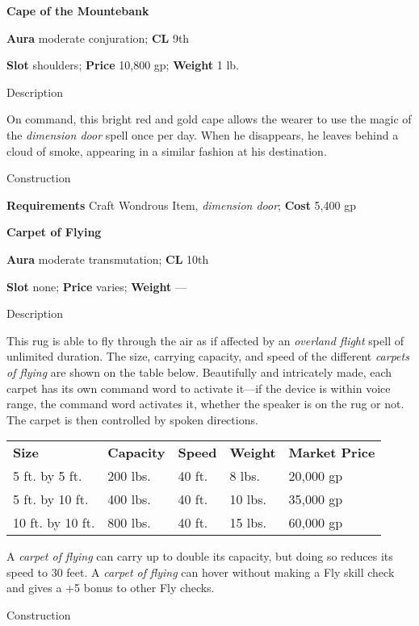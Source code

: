 \textbf{Cape of the Mountebank}
				
\textbf{Aura} moderate conjuration;\textbf{ CL }9th
				
\textbf{Slot} shoulders; \textbf{Price} 10,800 gp; \textbf{Weight} 1 lb.
				
Description
				
On command, this bright red and gold cape allows the wearer to use the magic of the \textit{dimension door }spell once per day. When he disappears, he leaves behind a cloud of smoke, appearing in a similar fashion at his destination. 
				
Construction
				
\textbf{Requirements} Craft Wondrous Item, \textit{dimension door}; \textbf{Cost }5,400 gp
				
\textbf{Carpet of Flying}
				
\textbf{Aura} moderate transmutation;\textbf{ CL }10th
				
\textbf{Slot} none; \textbf{Price} varies; \textbf{Weight }---
				
Description
				
This rug is able to fly through the air as if affected by an \textit{overland flight }spell of unlimited duration. The size, carrying capacity, and speed of the different \textit{carpets of flying }are shown on the table below. Beautifully and intricately made, each carpet has its own command word to activate it---if the device is within voice range, the command word activates it, whether the speaker is on the rug or not. The carpet is then controlled by spoken directions.
				
\begin{tabular}{lllll}
\textbf{Size} & \textbf{Capacity} & \textbf{Speed} & \textbf{Weight} & \textbf{Market Price}\\
5 ft. by 5 ft. & 200 lbs. & 40 ft. & 8 lbs. & 20,000 gp\\
5 ft. by 10 ft. & 400 lbs. & 40 ft. & 10 lbs. & 35,000 gp\\
10 ft. by 10 ft. & 800 lbs. & 40 ft. & 15 lbs. & 60,000 gp\\
\end{tabular}

				
A \textit{carpet of flying }can carry up to double its capacity, but doing so reduces its speed to 30 feet. A \textit{carpet of flying }can hover without making a Fly skill check and gives a +5 bonus to other Fly checks. 
				
Construction
				
